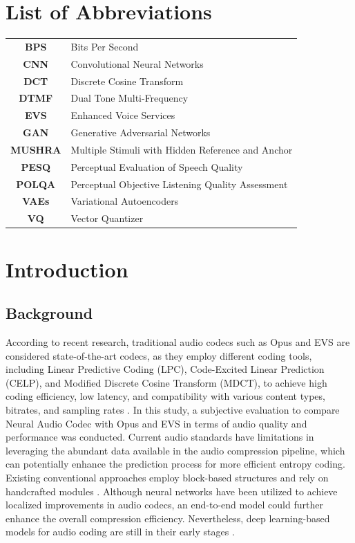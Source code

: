 \documentclass[12pt]{report}
\begin{document}
\chapter*{List of Abbreviations}
\begin{tabular}{c l}

\textbf{BPS}     &  Bits Per Second\\
\textbf{CNN}     &  Convolutional Neural Networks\\
\textbf{DCT}     & Discrete Cosine Transform\\
\textbf{DTMF}    &  Dual Tone Multi-Frequency\\
\textbf{EVS}     &  Enhanced Voice Services\\
\textbf{GAN}     &  Generative Adversarial Networks\\
\textbf{MUSHRA}  &  Multiple Stimuli with Hidden Reference and Anchor\\
\textbf{PESQ}    &  Perceptual Evaluation of Speech Quality\\
\textbf{POLQA}   &  Perceptual Objective Listening Quality Assessment\\ 
\textbf{VAEs}    &  Variational Autoencoders\\
\textbf{VQ}      &  Vector Quantizer
\end{tabular}

\chapter{Introduction}
\section{Background}
According to recent research, traditional audio codecs such as Opus and EVS are considered state-of-the-art codecs, as they employ different coding tools, including Linear Predictive Coding (LPC), Code-Excited Linear Prediction (CELP), and Modified Discrete Cosine Transform (MDCT), to achieve high coding efficiency, low latency, and compatibility with various content types, bitrates, and sampling rates \cite{opus_codec} \cite{evs_codec}. In this study, a subjective evaluation to compare Neural Audio Codec with Opus and EVS in terms of audio quality and performance was conducted. Current audio standards have limitations in leveraging the abundant data available in the audio compression pipeline, which can potentially enhance the prediction process for more efficient entropy coding. Existing conventional approaches \cite{opus_codec, evs_codec} employ block-based structures and rely on handcrafted modules \cite{brandenburg1999mpeg, sporer2004aac, fraunhofer1997mp3}. Although neural networks have been utilized to achieve localized improvements in audio codecs, an end-to-end model could further enhance the overall compression efficiency. Nevertheless, deep learning-based models for audio coding are still in their early stages \cite{zhang2020survey}.
\end{document}

